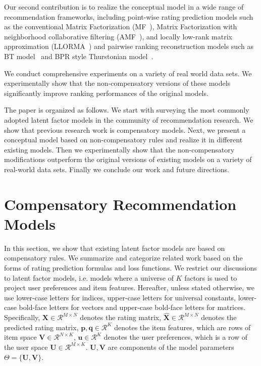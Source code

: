 \documentclass[letterpaper]{article} %
\newcommand{\Real}{\mathcal{R}}
\begin{document}
Our second contribution is to realize the conceptual model in a wide range of recommendation frameworks, including point-wise rating prediction models such as the conventional Matrix Factorization (MF~\cite{Koren2009Matrix}), Matrix Factorization with neighborhood collaborative filtering (AMF~\cite{Koren2008Factorization}), and locally low-rank matrix approximation (LLORMA~\cite{Lee2013Local}) and pairwise ranking reconstruction models such as BT model~\cite{Hu2016Improved} and BPR style  Thurstonian model~\cite{Rendle2009BPR}. 

We conduct comprehensive experiments on a variety of real world data sets. We experimentally show that the non-compensatory versions of these models significantly improve ranking performances of the original models. 

The paper is organized as follows. We start with surveying the most commonly adopted latent factor models in the community of recommendation research. We show that previous research work is compensatory models. Next, we present a conceptual model based on non-compensatory rules and realize it in different existing models. Then we experimentally show that the non-compensatory modifications outperform the original versions of existing models on a variety of real-world data sets. Finally we conclude our work and future directions.

\section{Compensatory Recommendation Models}\label{sec:previousmodel}
In this section, we show that existing latent factor models are based on compensatory rules. We summarize and categorize related work based on the forms of rating prediction formulas and loss functions. We restrict our discussions to latent factor models, i.e. models where a universe of $K$ factors is used to project  user preferences and item features. Hereafter, unless stated otherwise, we use lower-case letters for indices, upper-case letters for universal constants, lower-case bold-face letters for vectors and upper-case bold-face letters for matrices. Specifically, $\mathbf{X}\in \Real^{M\times N}$ denotes the rating matrix, $\hat{\mathbf{X}}\in \Real^{M\times N}$ denotes the predicted rating matrix,  $\mathbf{p},\mathbf{q}\in \Real^K$ denotes the item features, which are rows of item space $\mathbf{V}\in \Real^{N\times K}$, $\mathbf{u}\in \Real^K$ denotes the user preferences, which is a row of the user space $\mathbf{U}\in \Real^{M\times K}$.  $\mathbf{U},\mathbf{V}$ are components of the model parameters $\Theta=\{\mathbf{U},\mathbf{V} \}$.
\end{document}
